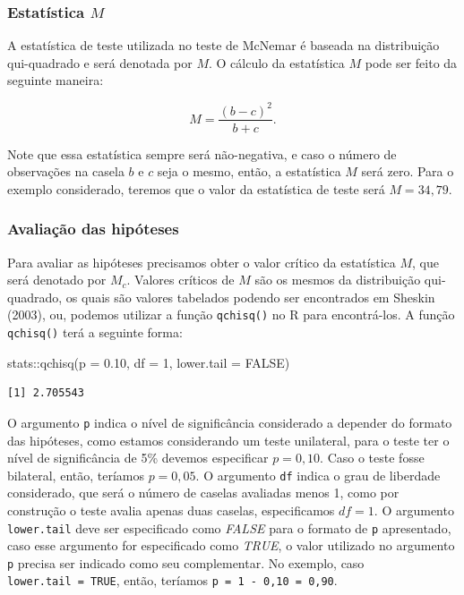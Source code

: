 \documentclass[
  letterpaper,
  DIV=11,
  numbers=noendperiod]{scrreprt}
\newenvironment{Shaded}{\begin{snugshade}}{\end{snugshade}}
\newcommand{\AttributeTok}[1]{\textcolor[rgb]{0.40,0.45,0.13}{#1}}
\newcommand{\ConstantTok}[1]{\textcolor[rgb]{0.56,0.35,0.01}{#1}}
\newcommand{\DecValTok}[1]{\textcolor[rgb]{0.68,0.00,0.00}{#1}}
\newcommand{\FloatTok}[1]{\textcolor[rgb]{0.68,0.00,0.00}{#1}}
\newcommand{\FunctionTok}[1]{\textcolor[rgb]{0.28,0.35,0.67}{#1}}
\newcommand{\NormalTok}[1]{\textcolor[rgb]{0.00,0.23,0.31}{#1}}
\newcommand{\SpecialCharTok}[1]{\textcolor[rgb]{0.37,0.37,0.37}{#1}}
\begin{document}
\hypertarget{estatuxedstica-m}{%
\subsubsection{\texorpdfstring{Estatística
\(M\)}{Estatística M}}\label{estatuxedstica-m}}

A estatística de teste utilizada no teste de McNemar é baseada na
distribuição qui-quadrado e será denotada por \(M\). O cálculo da
estatística \(M\) pode ser feito da seguinte maneira:

\[M = \displaystyle \frac{(b-c)^2}{b+c}.\]

Note que essa estatística sempre será não-negativa, e caso o número de
observações na casela \(b\) e \(c\) seja o mesmo, então, a estatística
\(M\) será zero. Para o exemplo considerado, teremos que o valor da
estatística de teste será \(M = 34,79\).

\hypertarget{avaliauxe7uxe3o-das-hipuxf3teses-4}{%
\subsubsection{Avaliação das
hipóteses}\label{avaliauxe7uxe3o-das-hipuxf3teses-4}}

Para avaliar as hipóteses precisamos obter o valor crítico da
estatística \(M\), que será denotado por \(M_c\). Valores críticos de
\(M\) são os mesmos da distribuição qui-quadrado, os quais são valores
tabelados podendo ser encontrados em Sheskin (2003), ou, podemos
utilizar a função \texttt{qchisq()} no R para encontrá-los. A função
\texttt{qchisq()} terá a seguinte forma:

\begin{Shaded}
\begin{Highlighting}[]
\NormalTok{stats}\SpecialCharTok{::}\FunctionTok{qchisq}\NormalTok{(}\AttributeTok{p =} \FloatTok{0.10}\NormalTok{, }\AttributeTok{df =} \DecValTok{1}\NormalTok{, }\AttributeTok{lower.tail =} \ConstantTok{FALSE}\NormalTok{)}
\end{Highlighting}
\end{Shaded}

\begin{verbatim}
[1] 2.705543
\end{verbatim}

O argumento \texttt{p} indica o nível de significância considerado a
depender do formato das hipóteses, como estamos considerando um teste
unilateral, para o teste ter o nível de significância de 5\% devemos
especificar \(p = 0,10\). Caso o teste fosse bilateral, então, teríamos
\(p = 0,05\). O argumento \texttt{df} indica o grau de liberdade
considerado, que será o número de caselas avaliadas menos 1, como por
construção o teste avalia apenas duas caselas, especificamos \(df = 1\).
O argumento \texttt{lower.tail} deve ser especificado como \emph{FALSE}
para o formato de \texttt{p} apresentado, caso esse argumento for
especificado como \emph{TRUE}, o valor utilizado no argumento \texttt{p}
precisa ser indicado como seu complementar. No exemplo, caso
\texttt{lower.tail\ =\ TRUE}, então, teríamos
\texttt{p\ =\ 1\ -\ 0,10\ =\ 0,90}.
\end{document}
